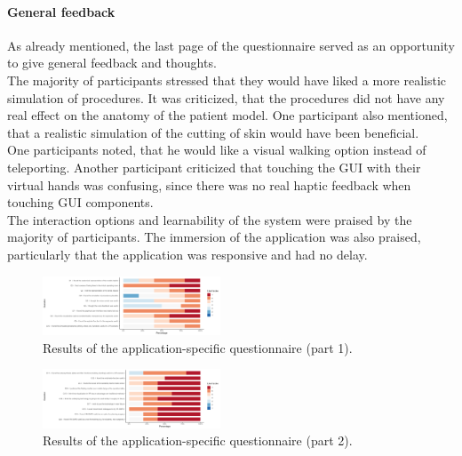 \paragraph{General feedback}
As already mentioned, the last page of the questionnaire served as 
an opportunity to give general feedback and thoughts.
\\ The majority of participants stressed that they would have liked
a more realistic simulation of procedures. It was criticized,
that the procedures did not have any real effect on the anatomy
of the patient model. One participant also mentioned,
that a realistic simulation of the cutting of skin would have
been beneficial. 
\\ One participants noted, that he would like
a visual walking option instead of teleporting. Another participant
criticized that touching the GUI with their virtual hands 
was confusing, since there was no real haptic feedback when 
touching GUI components. 
\\ The interaction options 
and learnability of the system were praised by the majority of 
participants. The immersion of the application was also praised,
particularly that the application was responsive and had no 
delay. 



\begin{figure}[ht]
    \centering
    \includegraphics[width=200px]{images/evaluation/VR-SET1.png}
    \caption{\label{fig::vrSet1}Results of the application-specific questionnaire (part 1).}
\end{figure}

\begin{figure}[ht]
    \centering
    \includegraphics[width=200px]{images/evaluation/VR-SET2.png}
    \caption{\label{fig::vrSet2}Results of the application-specific questionnaire (part 2).}
\end{figure}